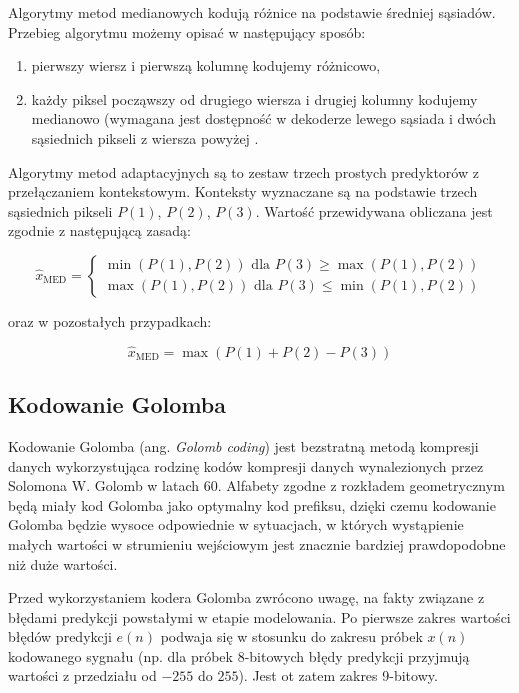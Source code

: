 \documentclass{article}
\begin{document}
Algorytmy metod medianowych kodują różnice na podstawie średniej sąsiadów. Przebieg algorytmu możemy opisać w następujący sposób:
\begin{enumerate}
 \item pierwszy wiersz i pierwszą kolumnę kodujemy różnicowo,
 \item każdy piksel począwszy od drugiego wiersza i drugiej kolumny kodujemy medianowo (wymagana jest dostępność w dekoderze lewego sąsiada i dwóch sąsiednich pikseli z wiersza powyżej \cite{differential_coding}.
\end{enumerate}


Algorytmy metod adaptacyjnych są to zestaw trzech prostych predyktorów z przełączaniem kontekstowym. Konteksty wyznaczane są na podstawie trzech sąsiednich pikseli $P(1)$, $P(2)$, $P(3)$. Wartość przewidywana obliczana jest zgodnie z następującą zasadą:


\begin{equation}
\hat{x}_{\mathrm{MED}}=\left\{\begin{array}{l}
\min (P(1), P(2)) \text{ dla } P(3) \geq \max(P(1), P(2)) \\
\max (P(1), P(2)) \text{ dla } P(3) \leq \min(P(1), P(2))
\end{array}\right.
\end{equation}

oraz w pozostałych przypadkach: 


\begin{equation}
\hat{x}_{\mathrm{MED}}= \max(P(1) + P(2) - P(3))
\end{equation}

\subsection{Kodowanie Golomba}

Kodowanie Golomba (ang. \emph{Golomb coding}) jest bezstratną metodą kompresji danych wykorzystująca rodzinę kodów kompresji danych wynalezionych przez Solomona W. Golomb w latach 60. Alfabety zgodne z rozkładem geometrycznym będą miały kod Golomba jako optymalny kod prefiksu, dzięki czemu kodowanie Golomba będzie wysoce odpowiednie w sytuacjach, w których wystąpienie małych wartości w strumieniu wejściowym jest znacznie bardziej prawdopodobne niż duże wartości.

Przed wykorzystaniem kodera Golomba zwrócono uwagę, na fakty związane z błędami predykcji powstałymi w etapie modelowania. Po pierwsze zakres wartości błędów predykcji $e(n)$ podwaja się w stosunku do zakresu próbek $x(n)$ kodowanego sygnału (np. dla próbek 8-bitowych błędy predykcji przyjmują wartości z przedziału od $-255$ do $255$). Jest ot zatem zakres 9-bitowy.
\end{document}
